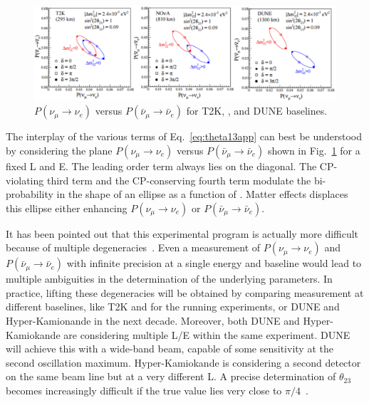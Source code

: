 \begin{figure} [htbp!]
\begin{center}
\includegraphics[width=14cm]{figures/t2k_nova_dune_ellipse.pdf}
\caption{\label{fig:novaellipse} $ P (\nu_\mu \rightarrow \nu_e)$ versus  $ P (\bar{\nu}_\mu \rightarrow \bar{\nu}_e)$ for T2K, \nova, and DUNE baselines.}
\end{center}
\label{fig:biprob}
\end{figure}

The interplay of the various terms of Eq.~\ref{eq:theta13app} can best be understood by considering the plane $ P (\nu_\mu \rightarrow \nu_e)$ versus  $ P (\bar{\nu}_\mu \rightarrow \bar{\nu}_e)$ shown in Fig.~\ref{fig:biprob} for a fixed L and E. The leading order term always lies on the diagonal. The CP-violating third term and the CP-conserving fourth term modulate the bi-probability in the shape of an ellipse as a function of \dcp.
Matter effects displaces this ellipse either enhancing $ P (\nu_\mu \rightarrow \nu_e)$ or 
$ P (\bar{\nu}_\mu \rightarrow \bar{\nu}_e)$.


It has been pointed out that this experimental program is actually more difficult because of multiple degeneracies~\cite{burguet,parkedeg}. Even a measurement of $ P (\nu_\mu \rightarrow \nu_e)$ and  $ P (\bar{\nu}_\mu \rightarrow \bar{\nu}_e)$ with infinite precision at a single energy and baseline would lead to multiple ambiguities in the determination of the underlying parameters. In practice, lifting these degeneracies will be obtained by comparing measurement at different baselines, like T2K and \nova for the running experiments, or DUNE and Hyper-Kamionande in the next decade. Moreover, both DUNE and Hyper-Kamiokande are considering multiple L/E within the same experiment. DUNE will achieve this with a wide-band beam, capable of some sensitivity at the second oscillation maximum. Hyper-Kamiokande is considering a second detector on the same beam line but at a very different L. A precise determination of $\theta_{23}$ becomes increasingly difficult if the true value lies very close to $\pi/4$~\cite{parkedeg}. 

